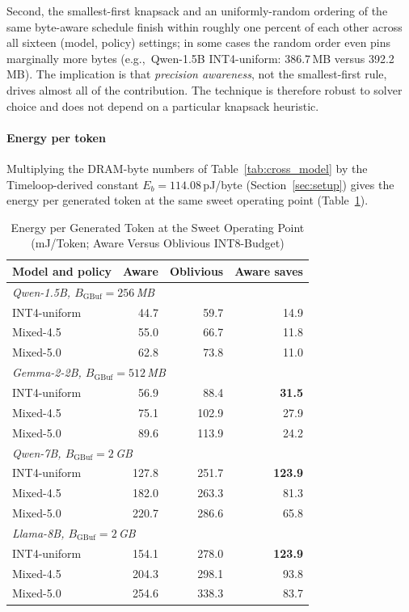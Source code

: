 \documentclass{ieeeaccess}
\begin{document}
Second, the smallest-first knapsack and an uniformly-random ordering of
the same byte-aware schedule finish within roughly one percent of each
other across all sixteen (model, policy) settings; in some cases the
random order even pins marginally more bytes (e.g.,~Qwen-1.5B
INT4-uniform: 386.7\,MB versus 392.2\,MB). The implication is that
\emph{precision awareness}, not the smallest-first rule, drives almost
all of the contribution. The technique is therefore robust to solver
choice and does not depend on a particular knapsack heuristic.

\paragraph{Energy per token}
Multiplying the DRAM-byte numbers of Table~\ref{tab:cross_model} by the
Timeloop-derived constant $E_b\!=\!114.08$\,pJ/byte
(Section~\ref{sec:setup}) gives the energy per generated token at the
same sweet operating point (Table~\ref{tab:energy_per_token}).

\begin{table}[t]
\caption{Energy per Generated Token at the Sweet Operating Point (mJ/Token; Aware Versus Oblivious INT8-Budget)}
\label{tab:energy_per_token}
\centering
\small
\begin{tabular}{lrrr}
\toprule
Model and policy   & Aware & Oblivious & Aware saves \\
\midrule
\multicolumn{4}{l}{\emph{Qwen-1.5B, $B_{\mathrm{GBuf}}\!=\!256$\,MB}} \\
\quad INT4-uniform  & 44.7 & 59.7  & 14.9 \\
\quad Mixed-4.5     & 55.0 & 66.7  & 11.8 \\
\quad Mixed-5.0     & 62.8 & 73.8  & 11.0 \\
\midrule
\multicolumn{4}{l}{\emph{Gemma-2-2B, $B_{\mathrm{GBuf}}\!=\!512$\,MB}} \\
\quad INT4-uniform  & 56.9 & 88.4  & \textbf{31.5} \\
\quad Mixed-4.5     & 75.1 & 102.9 & 27.9 \\
\quad Mixed-5.0     & 89.6 & 113.9 & 24.2 \\
\midrule
\multicolumn{4}{l}{\emph{Qwen-7B, $B_{\mathrm{GBuf}}\!=\!2$\,GB}} \\
\quad INT4-uniform  & 127.8 & 251.7 & \textbf{123.9} \\
\quad Mixed-4.5     & 182.0 & 263.3 & 81.3 \\
\quad Mixed-5.0     & 220.7 & 286.6 & 65.8 \\
\midrule
\multicolumn{4}{l}{\emph{Llama-8B, $B_{\mathrm{GBuf}}\!=\!2$\,GB}} \\
\quad INT4-uniform  & 154.1 & 278.0 & \textbf{123.9} \\
\quad Mixed-4.5     & 204.3 & 298.1 & 93.8 \\
\quad Mixed-5.0     & 254.6 & 338.3 & 83.7 \\
\bottomrule
\end{tabular}
\end{table}
\end{document}
